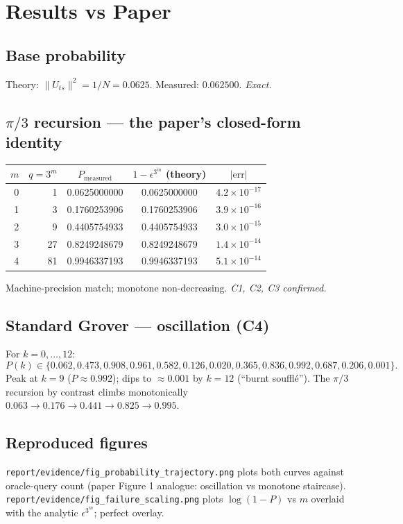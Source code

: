 \documentclass[11pt]{article}
\begin{document}
\section{Results vs Paper}

\subsection{Base probability}
Theory: $\|U_{ts}\|^2 = 1/N = 0.0625$. Measured: $0.062500$. \emph{Exact.}

\subsection{$\pi/3$ recursion --- the paper's closed-form identity}
\begin{center}
\begin{tabular}{@{}rrccc@{}}
\toprule
$m$ & $q = 3^m$ & $P_{\text{measured}}$ & $1 - \epsilon^{3^m}$ (theory) & $|\text{err}|$ \\
\midrule
0 &  1 & 0.0625000000 & 0.0625000000 & $4.2\times10^{-17}$ \\
1 &  3 & 0.1760253906 & 0.1760253906 & $3.9\times10^{-16}$ \\
2 &  9 & 0.4405754933 & 0.4405754933 & $3.0\times10^{-15}$ \\
3 & 27 & 0.8249248679 & 0.8249248679 & $1.4\times10^{-14}$ \\
4 & 81 & 0.9946337193 & 0.9946337193 & $5.1\times10^{-14}$ \\
\bottomrule
\end{tabular}
\end{center}
Machine-precision match; monotone non-decreasing. \emph{C1, C2, C3 confirmed.}

\subsection{Standard Grover --- oscillation (C4)}
For $k = 0, \dots, 12$:
\[
P(k) \in \{0.062, 0.473, 0.908, 0.961, 0.582, 0.126, 0.020,
0.365, 0.836, 0.992, 0.687, 0.206, 0.001\}.
\]
Peak at $k = 9$ ($P \approx 0.992$); dips to $\approx 0.001$ by $k = 12$
(``burnt souffl\'e''). The $\pi/3$ recursion by contrast climbs monotonically
$0.063 \to 0.176 \to 0.441 \to 0.825 \to 0.995$.

\subsection{Reproduced figures}
\texttt{report/evidence/fig\_probability\_trajectory.png} plots both curves
against oracle-query count (paper Figure 1 analogue: oscillation vs monotone
staircase). \texttt{report/evidence/fig\_failure\_scaling.png} plots
$\log(1 - P)$ vs $m$ overlaid with the analytic $\epsilon^{3^m}$; perfect
overlay.
\end{document}
